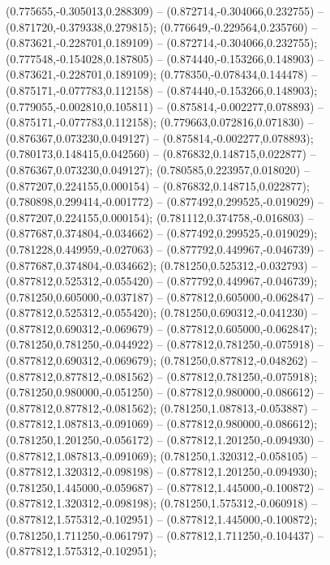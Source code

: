  (0.775655,-0.305013,0.288309) -- (0.872714,-0.304066,0.232755) -- (0.871720,-0.379338,0.279815);
 (0.776649,-0.229564,0.235760) -- (0.873621,-0.228701,0.189109) -- (0.872714,-0.304066,0.232755);
 (0.777548,-0.154028,0.187805) -- (0.874440,-0.153266,0.148903) -- (0.873621,-0.228701,0.189109);
 (0.778350,-0.078434,0.144478) -- (0.875171,-0.077783,0.112158) -- (0.874440,-0.153266,0.148903);
 (0.779055,-0.002810,0.105811) -- (0.875814,-0.002277,0.078893) -- (0.875171,-0.077783,0.112158);
 (0.779663,0.072816,0.071830) -- (0.876367,0.073230,0.049127) -- (0.875814,-0.002277,0.078893);
 (0.780173,0.148415,0.042560) -- (0.876832,0.148715,0.022877) -- (0.876367,0.073230,0.049127);
 (0.780585,0.223957,0.018020) -- (0.877207,0.224155,0.000154) -- (0.876832,0.148715,0.022877);
 (0.780898,0.299414,-0.001772) -- (0.877492,0.299525,-0.019029) -- (0.877207,0.224155,0.000154);
 (0.781112,0.374758,-0.016803) -- (0.877687,0.374804,-0.034662) -- (0.877492,0.299525,-0.019029);
 (0.781228,0.449959,-0.027063) -- (0.877792,0.449967,-0.046739) -- (0.877687,0.374804,-0.034662);
 (0.781250,0.525312,-0.032793) -- (0.877812,0.525312,-0.055420) -- (0.877792,0.449967,-0.046739);
 (0.781250,0.605000,-0.037187) -- (0.877812,0.605000,-0.062847) -- (0.877812,0.525312,-0.055420);
 (0.781250,0.690312,-0.041230) -- (0.877812,0.690312,-0.069679) -- (0.877812,0.605000,-0.062847);
 (0.781250,0.781250,-0.044922) -- (0.877812,0.781250,-0.075918) -- (0.877812,0.690312,-0.069679);
 (0.781250,0.877812,-0.048262) -- (0.877812,0.877812,-0.081562) -- (0.877812,0.781250,-0.075918);
 (0.781250,0.980000,-0.051250) -- (0.877812,0.980000,-0.086612) -- (0.877812,0.877812,-0.081562);
 (0.781250,1.087813,-0.053887) -- (0.877812,1.087813,-0.091069) -- (0.877812,0.980000,-0.086612);
 (0.781250,1.201250,-0.056172) -- (0.877812,1.201250,-0.094930) -- (0.877812,1.087813,-0.091069);
 (0.781250,1.320312,-0.058105) -- (0.877812,1.320312,-0.098198) -- (0.877812,1.201250,-0.094930);
 (0.781250,1.445000,-0.059687) -- (0.877812,1.445000,-0.100872) -- (0.877812,1.320312,-0.098198);
 (0.781250,1.575312,-0.060918) -- (0.877812,1.575312,-0.102951) -- (0.877812,1.445000,-0.100872);
 (0.781250,1.711250,-0.061797) -- (0.877812,1.711250,-0.104437) -- (0.877812,1.575312,-0.102951);
